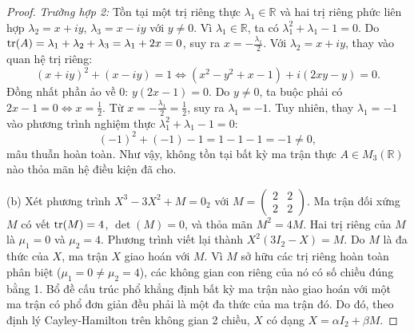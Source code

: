 \documentclass{article}
\begin{document}
\begin{proof}
	\emph{Trường hợp 2:} Tồn tại một trị riêng thực $\lambda_1 \in \mathbb{R}$ và hai trị riêng phức liên hợp $\lambda_2 = x + iy$, $\lambda_3 = x - iy$ với $y \ne 0$.
	Vì $\lambda_1 \in \mathbb{R}$, ta có $\lambda_1^2 + \lambda_1 - 1 = 0$. 
	Do ${\rm tr}(A) = \lambda_1 + \lambda_2 + \lambda_3 = \lambda_1 + 2x = 0$, suy ra $x = -\frac{\lambda_1}{2}$.
	Với $\lambda_2 = x + iy$, thay vào quan hệ trị riêng:
	\begin{equation*}
		(x + iy)^2 + (x - iy) = 1 \iff (x^2 - y^2 + x - 1) + i(2xy - y) = 0.
	\end{equation*}
	Đồng nhất phần ảo về 0: $y(2x - 1) = 0$. Do $y \ne 0$, ta buộc phải có $2x - 1 = 0 \iff x = \frac{1}{2}$.
	Từ $x = -\frac{\lambda_1}{2} = \frac{1}{2}$, suy ra $\lambda_1 = -1$.
	Tuy nhiên, thay $\lambda_1 = -1$ vào phương trình nghiệm thực $\lambda_1^2 + \lambda_1 - 1 = 0$:
	\begin{equation*}
		(-1)^2 + (-1) - 1 = 1 - 1 - 1 = -1 \ne 0,
	\end{equation*}
	mâu thuẫn hoàn toàn. Như vậy, không tồn tại bất kỳ ma trận thực $A \in M_3(\mathbb{R})$ nào thỏa mãn hệ điều kiện đã cho.
	
	(b) Xét phương trình $X^3 - 3X^2 + M = 0_2$ với $M = \begin{pmatrix} 2 & 2 \\ 2 & 2 \end{pmatrix}$.
	Ma trận đối xứng $M$ có vết ${\rm tr}(M) = 4$, $\det(M) = 0$, và thỏa mãn $M^2 = 4M$. Hai trị riêng của $M$ là $\mu_1 = 0$ và $\mu_2 = 4$.
	Phương trình viết lại thành $X^2(3I_2 - X) = M$. Do $M$ là đa thức của $X$, ma trận $X$ giao hoán với $M$. Vì $M$ sở hữu các trị riêng hoàn toàn phân biệt ($\mu_1 = 0 \ne \mu_2 = 4$), các không gian con riêng của nó có số chiều đúng bằng 1. Bổ đề cấu trúc phổ khẳng định bất kỳ ma trận nào giao hoán với một ma trận có phổ đơn giản đều phải là một đa thức của ma trận đó. Do đó, theo định lý Cayley-Hamilton trên không gian 2 chiều, $X$ có dạng $X = \alpha I_2 + \beta M$.
	

\end{proof}
\end{document}

